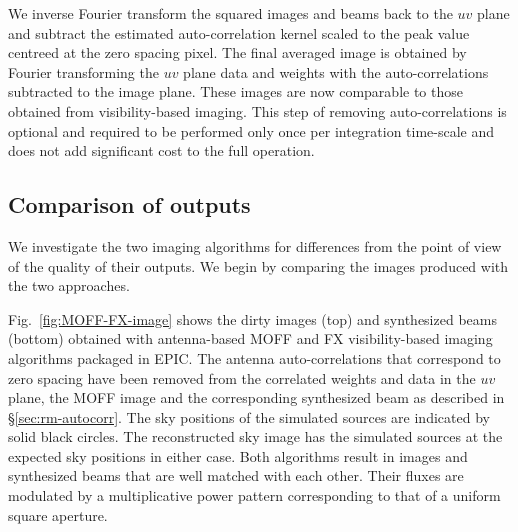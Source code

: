 \documentclass[a4paper,fleqn,usenatbib]{mnras}
\begin{document}
We inverse Fourier transform the squared images and beams back to the $uv$ 
plane and subtract the estimated auto-correlation kernel scaled to the peak 
value centreed at the zero spacing pixel. The final averaged image is obtained 
by Fourier transforming the $uv$ plane data and weights with the 
auto-correlations subtracted to the image plane. These images are now comparable 
to those obtained from visibility-based imaging. This step of removing 
auto-correlations is optional and required to be performed only once per 
integration time-scale and does not add significant cost to the full operation.

\subsection{Comparison of outputs}\label{sec:diff}

We investigate the two imaging algorithms for differences from the point of 
view of the quality of their outputs. We begin by comparing the images produced 
with the two approaches. 

Fig.~\ref{fig:MOFF-FX-image} shows the dirty images (top) and synthesized beams
(bottom) obtained with antenna-based MOFF and FX visibility-based imaging 
algorithms packaged in EPIC. The antenna auto-correlations that correspond to 
zero spacing have been removed from the correlated weights and data in the 
$uv$ plane, the MOFF image and the corresponding synthesized beam as 
described in \S\ref{sec:rm-autocorr}. The sky positions of the simulated sources 
are indicated by solid black circles. The reconstructed sky image has the 
simulated sources at the expected sky positions in either case. Both algorithms 
result in images and synthesized beams that are well matched with each other. 
Their fluxes are modulated by a multiplicative power pattern corresponding to 
that of a uniform square aperture. 
\end{document}
